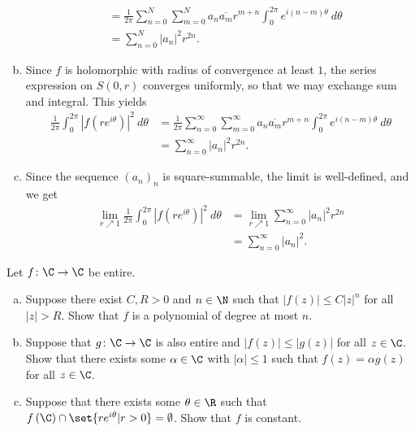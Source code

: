 \documentclass[10pt]{mypackage}
\begin{document}
\begin{solution}
\begin{enumerate}[(a)]
\begin{align*}
                                                                                                       &= \frac{1}{2\pi} \sum_{n=0}^{N}\sum_{m=0}^{N} a_n \overline{a_m} r^{m + n} \int_{0}^{2\pi} e^{i\left( n-m \right)\theta}\:d\theta\\
                                                                                                       &= \sum_{n=0}^{N} \left\vert a_n \right\vert^2 r^{2n}.
      \end{align*}
    \item Since $f$ is holomorphic with radius of convergence at least $1$, the series expression on $ S\left( 0,r \right) $ converges uniformly, so that we may exchange sum and integral. This yields
      \begin{align*}
        \frac{1}{2\pi} \int_{0}^{2\pi} \left\vert f\left( re^{i\theta} \right) \right\vert^2\:d\theta &= \frac{1}{2\pi}\sum_{n=0}^{\infty}\sum_{m=0}^{\infty}a_n \overline{a_m} r^{m + n} \int_{0}^{2\pi} e^{i\left( n-m \right)\theta}\:d\theta\\
                                                                                                      &= \sum_{n=0}^{\infty}\left\vert a_n \right\vert^2 r^{2n}.
      \end{align*}
    \item Since the sequence $\left( a_n \right)_n$ is square-summable, the limit is well-defined, and we get
      \begin{align*}
        \lim_{r\nearrow 1} \frac{1}{2\pi} \int_{0}^{2\pi} \left\vert f\left( re^{i\theta} \right) \right\vert^2\:d\theta &= \lim_{r\nearrow 1} \sum_{n=0}^{\infty}\left\vert a_n \right\vert^2 r^{2n}\\
                                                                                                                         &= \sum_{n=0}^{\infty}\left\vert a_n \right\vert^2.
      \end{align*}
  \end{enumerate}
\end{solution}
\begin{problem}[Problem 3]
  Let $f\colon \C\rightarrow \C$ be entire.
  \begin{enumerate}[(a)]
    \item Suppose there exist $C,R > 0$ and $n\in \N$ such that $\left\vert f(z) \right\vert \leq C\left\vert z \right\vert^{n}$ for all $\left\vert z \right\vert > R$. Show that $f$ is a polynomial of degree at most $n$.
    \item Suppose that $g\colon \C\rightarrow \C$ is also entire and $ \left\vert f(z) \right\vert \leq \left\vert g(z) \right\vert $ for all $z\in \C$. Show that there exists some $\alpha\in \C$ with $\left\vert \alpha \right\vert \leq 1$ such that $f(z) = \alpha g(z)$ for all $z\in \C$.
    \item Suppose that there exists some $\theta\in \R$ such that $f\left( \C \right)\cap \set{re^{i\theta} | r > 0} = \emptyset$. Show that $f$ is constant.
  \end{enumerate}
\end{problem}
\end{document}
